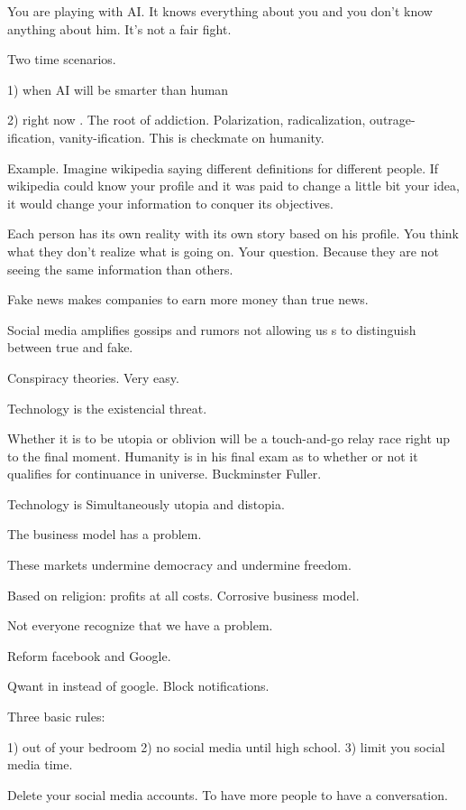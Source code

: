  You are playing with AI. It knows everything about you and you don't know anything about him.  It's not a fair fight. 
 
 Two time scenarios. 
 
 1) when AI will be smarter than human
 
 2) right now . The root of addiction.
  Polarization, radicalization, outrage-ification, vanity-ification. 
 This is checkmate on humanity. 
 
 Example. Imagine wikipedia saying different definitions for different people. If wikipedia could know your profile and it was paid to change 
 a little bit your idea, it would change your information to conquer its objectives. 
 
 Each person has its own reality with its own story based on his profile. 
 You think what they don't realize what is going on. Your question. Because they are not seeing the same information than others. 
 
 Fake news makes companies to earn more money than true news. 
 
 Social media amplifies gossips and rumors not allowing us s to distinguish between true and fake. 
 
 Conspiracy theories. Very easy. 
 
 Technology is the existencial threat. 
 
 Whether it is to be utopia or oblivion will be a touch-and-go relay race right up to the final moment. Humanity is in his final exam as to 
 whether or not it qualifies for continuance in universe. 
 Buckminster Fuller. 
 
 
 Technology is Simultaneously utopia and distopia. 
 
 The business model has a problem. 
 
 These markets undermine democracy and undermine freedom. 
 
 Based on religion: profits at all costs. Corrosive business model.  
 
 Not everyone recognize that we have a problem. 
 
 Reform facebook and Google. 
 
 Qwant in instead of google. Block notifications. 
 
 
 Three basic rules:
 
 1) out of your bedroom
 2) no social media until high school. 
 3) limit you social media time. 
 
 
 Delete your social media accounts. To have more people to have a conversation. 
 

